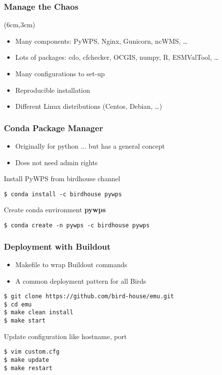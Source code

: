 \documentclass{beamer}
\begin{document}
\begin{frame}
  \frametitle<presentation>{Manage the Chaos}


  \begin{textblock*}{7cm}(6cm,3cm)
  \begin{itemize}
    \item Many components: PyWPS, Nginx, Gunicorn, ncWMS, \ldots
    \item Lots of packages: cdo, cfchecker, OCGIS, numpy, R, ESMValTool, \ldots
    \item Many configurations to set-up
    \item Reproducible installation
    \item Different Linux distributions (Centos, Debian, \ldots)
  \end{itemize}
  \end{textblock*}
\end{frame}

\begin{frame}[fragile]
  \frametitle<presentation>{Conda Package Manager}
  \begin{itemize}
    \item Originally for python ... but has a general concept
    \item Does not need admin rights
  \end{itemize}
  Install PyWPS from birdhouse channel
    \begin{verbatim}
$ conda install -c birdhouse pywps
    \end{verbatim}
  Create conda environment \textbf{pywps}
    \begin{verbatim}
$ conda create -n pywps -c birdhouse pywps
    \end{verbatim}
\end{frame}

\begin{frame}[fragile]
  \frametitle<presentation>{Deployment with Buildout}
  \begin{itemize}
    \item Makefile to wrap Buildout commands
    \item A common deployment pattern for all Birds
  \end{itemize}
    \begin{verbatim}
$ git clone https://github.com/bird-house/emu.git
$ cd emu
$ make clean install
$ make start
    \end{verbatim}
  Update configuration like hostname, port
    \begin{verbatim}
$ vim custom.cfg
$ make update
$ make restart
    \end{verbatim}
\end{frame}
\end{document}
